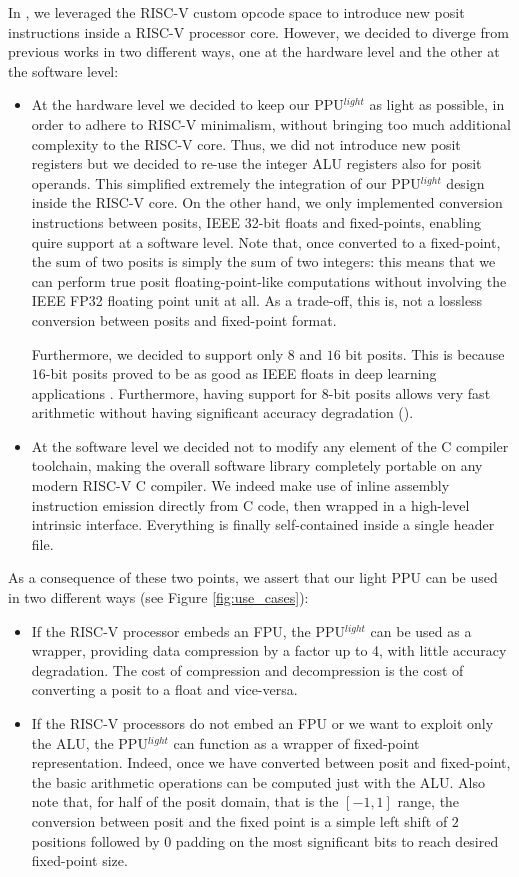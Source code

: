 In \cite{ppulight}, we leveraged the RISC-V custom opcode space to introduce new posit instructions inside a RISC-V processor core.
However, we decided to diverge from previous works in two different ways, one at the hardware level and the other at the software level:
\begin{itemize}
    \item At the hardware level we decided to keep our PPU$^{light}$ as light as possible, in order to adhere to RISC-V minimalism, without bringing too much additional complexity to the RISC-V core. Thus, we did not introduce new posit registers but we decided to re-use the integer ALU registers also for posit operands. This simplified extremely the integration of our PPU$^{light}$ design inside the RISC-V core. On the other hand, we only implemented conversion instructions between posits, IEEE 32-bit floats  and fixed-points, enabling quire support at a software level. Note that, once converted to a fixed-point, the sum of two posits is simply the sum of two integers: this means that we can perform true posit floating-point-like computations without involving the IEEE FP32 floating point unit at all. As a trade-off, this is, not a lossless conversion between posits and fixed-point format.
    
    Furthermore, we decided to support only $8$ and $16$ bit posits. This is because $16$-bit posits proved to be as good as IEEE floats in deep learning applications \cite{deeppositron,positnn,9066876}. Furthermore, having support for $8$-bit posits allows very fast arithmetic without having significant accuracy degradation (\cite{coco_et_al_ieeespm_2020,coco2020sensors}).
    \item At the software level we decided not to modify any element of the C compiler toolchain, making the overall software library completely portable on any modern RISC-V C compiler. We indeed make use of inline assembly instruction emission directly from C code, then wrapped in a high-level intrinsic interface. Everything is finally self-contained inside a single header file.
\end{itemize}

As a consequence of these two points, we assert that our light PPU can be used in two different ways (see Figure \ref{fig:use_cases}):
\begin{itemize}
    \item If the RISC-V processor embeds an FPU, the PPU$^{light}$ can be used as a wrapper, providing data compression by a factor up to 4, with little accuracy degradation. The cost of compression and decompression is the cost of converting a posit to a float and vice-versa.
    \item If the RISC-V processors do not embed an FPU or we want to exploit only the ALU, the PPU$^{light}$ can function as a wrapper of fixed-point representation. Indeed, once we have converted between posit and fixed-point, the basic arithmetic operations can be computed just with the ALU. Also note that, for half of the posit domain, that is the $[-1,1]$ range, the conversion between posit and the fixed point is a simple left shift of $2$ positions followed by $0$ padding on the most significant bits to reach desired fixed-point size.
\end{itemize}

